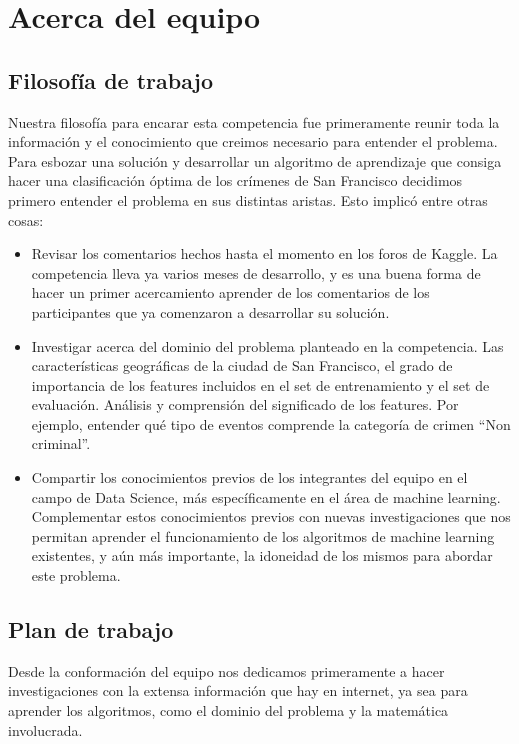 \section{Acerca del equipo} %
\label{sec:acerca_de}

\subsection{Filosofía de trabajo} %
\label{sub:filosofia}

Nuestra filosofía para encarar esta competencia fue primeramente reunir toda la información y el conocimiento que creimos necesario para entender el problema. Para esbozar una solución y desarrollar un algoritmo de aprendizaje que consiga hacer una clasificación óptima de los crímenes de San Francisco decidimos primero entender el problema en sus distintas aristas. Esto implicó entre otras cosas:

\begin{itemize}
  \item Revisar los comentarios hechos hasta el momento en los foros de Kaggle. La competencia lleva ya varios meses de desarrollo, y es una buena forma de hacer un primer acercamiento aprender de los comentarios de los participantes que ya comenzaron a desarrollar su solución.
  \item Investigar acerca del dominio del problema planteado en la competencia. Las características geográficas de la ciudad de San Francisco, el grado de importancia de los features incluidos en el set de entrenamiento y el set de evaluación. Análisis y comprensión del significado de los features. Por ejemplo, entender qué tipo de eventos comprende la categoría de crimen ``Non criminal''. 
  \item Compartir los conocimientos previos de los integrantes del equipo en el campo de Data Science, más específicamente en el área de machine learning. Complementar estos conocimientos previos con nuevas investigaciones que nos permitan aprender el funcionamiento de los algoritmos de machine learning existentes, y aún más importante, la idoneidad de los mismos para abordar este problema.
\end{itemize}

\subsection{Plan de trabajo} %
\label{sub:plan}

Desde la conformación del equipo nos dedicamos primeramente a hacer investigaciones con la extensa información que hay en internet, ya sea para aprender los algoritmos, como el dominio del problema y la matemática involucrada.


